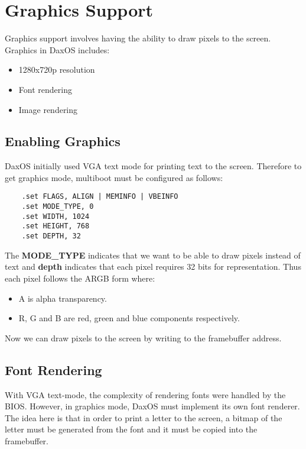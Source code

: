 \chapter{Graphics Support}\label{chapter:Graphics Support}

Graphics support involves having the ability to draw pixels to the screen.\\
Graphics in DaxOS includes:
\begin{itemize}
    \item 1280x720p resolution
    \item Font rendering
    \item Image rendering
\end{itemize}

\section{Enabling Graphics}\label{section:Enabling Graphics}

DaxOS initially used VGA text mode for printing text to the screen. Therefore to get graphics mode, multiboot 
must be configured as follows:

\vspace{0.5cm}
\begin{lstlisting}
    .set FLAGS, ALIGN | MEMINFO | VBEINFO
    .set MODE_TYPE, 0
    .set WIDTH, 1024 
    .set HEIGHT, 768
    .set DEPTH, 32
\end{lstlisting}
\pagebreak

The \textbf{MODE\_TYPE} indicates that we want to be able to draw pixels instead of text and \textbf{depth} indicates
that each pixel requires 32 bits for representation. Thus each pixel follows the ARGB form where:
\begin{itemize}
    \item A is alpha transparency.
    \item R, G and B are red, green and blue components respectively.
\end{itemize}

Now we can draw pixels to the screen by writing to the framebuffer address.


\section{Font Rendering}\label{section:Font Rendering}

With VGA text-mode, the complexity of rendering fonts were handled by the BIOS. However, in graphics mode, DaxOS must
implement its own font renderer. The idea here is that in order to print a letter to the screen, a bitmap of the 
letter must be generated from the font and it must be copied into the framebuffer.

